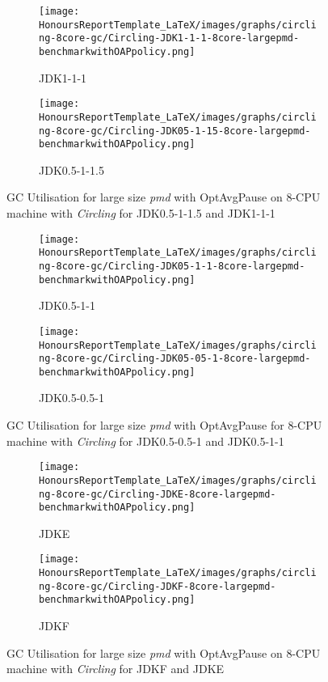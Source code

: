 \newpage
\begin{figure} [H]
\begin{subfigure}{1\textwidth}
\texttt{[image: HonoursReportTemplate\_LaTeX/images/graphs/circling-8core-gc/Circling-JDK1-1-1-8core-largepmd-benchmarkwithOAPpolicy.png]}
\caption{JDK1-1-1}
\label{fig:circling-gc-04}
\end{subfigure}
\begin{subfigure}{1\textwidth}
\texttt{[image: HonoursReportTemplate\_LaTeX/images/graphs/circling-8core-gc/Circling-JDK05-1-15-8core-largepmd-benchmarkwithOAPpolicy.png]}
\caption{JDK0.5-1-1.5}
\label{fig:circling-gc-09}
\end{subfigure}
\caption{GC Utilisation for large size \emph{pmd} with OptAvgPause on 8-CPU machine with \emph{Circling} for JDK0.5-1-1.5 and JDK1-1-1}
\end{figure}
\newpage
\begin{figure} [H]
\begin{subfigure}{1\textwidth}
\texttt{[image: HonoursReportTemplate\_LaTeX/images/graphs/circling-8core-gc/Circling-JDK05-1-1-8core-largepmd-benchmarkwithOAPpolicy.png]}
\caption{JDK0.5-1-1}
\label{fig:circling-gc-05}
\end{subfigure}
\begin{subfigure}{1\textwidth}
\texttt{[image: HonoursReportTemplate\_LaTeX/images/graphs/circling-8core-gc/Circling-JDK05-05-1-8core-largepmd-benchmarkwithOAPpolicy.png]}
\caption{JDK0.5-0.5-1}
\label{fig:circling-gc-06}
\end{subfigure}
\caption{GC Utilisation for large size \emph{pmd} with OptAvgPause for 8-CPU machine with \emph{Circling} for JDK0.5-0.5-1 and JDK0.5-1-1}
\end{figure}
\newpage
\begin{figure} [H]
\begin{subfigure}{1\textwidth}
\texttt{[image: HonoursReportTemplate\_LaTeX/images/graphs/circling-8core-gc/Circling-JDKE-8core-largepmd-benchmarkwithOAPpolicy.png]}
\caption{JDKE}
\label{fig:circling-gc-07}
\end{subfigure}
\begin{subfigure}{1\textwidth}
\texttt{[image: HonoursReportTemplate\_LaTeX/images/graphs/circling-8core-gc/Circling-JDKF-8core-largepmd-benchmarkwithOAPpolicy.png]}
\caption{JDKF}
\label{fig:circling-gc-08}
\end{subfigure}
\caption{GC Utilisation for large size \emph{pmd} with OptAvgPause on 8-CPU machine with \emph{Circling} for JDKF and JDKE}
\end{figure}
\newpage
